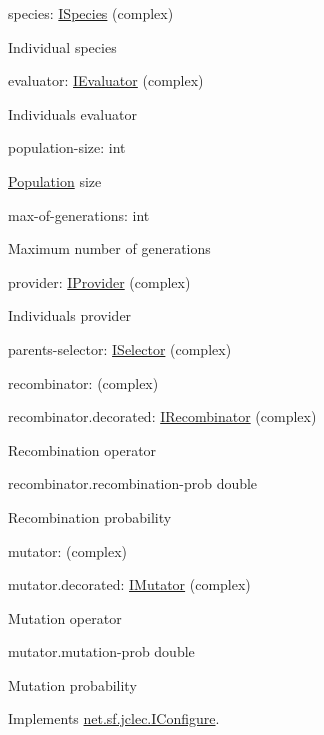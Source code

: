 \begin{DoxyItemize}
\item {\ttfamily species\-: \hyperlink{interfacenet_1_1sf_1_1jclec_1_1_i_species}{I\-Species} (complex)}

Individual species 
\item {\ttfamily evaluator\-: \hyperlink{interfacenet_1_1sf_1_1jclec_1_1_i_evaluator}{I\-Evaluator} (complex)}

Individuals evaluator 
\item {\ttfamily population-\/size\-: int}

\hyperlink{classnet_1_1sf_1_1jclec_1_1_population}{Population} size 
\item {\ttfamily max-\/of-\/generations\-: int}

Maximum number of generations  
\item {\ttfamily provider\-: \hyperlink{interfacenet_1_1sf_1_1jclec_1_1_i_provider}{I\-Provider} (complex)}

Individuals provider  
\item {\ttfamily parents-\/selector\-: \hyperlink{interfacenet_1_1sf_1_1jclec_1_1_i_selector}{I\-Selector} (complex)}  
\item {\ttfamily recombinator\-: (complex)} 
\begin{DoxyItemize}
\item {\ttfamily recombinator.\-decorated\-: \hyperlink{interfacenet_1_1sf_1_1jclec_1_1_i_recombinator}{I\-Recombinator} (complex)}

Recombination operator 
\item {\ttfamily recombinator.\-recombination-\/prob double}

Recombination probability  
\end{DoxyItemize}
\item {\ttfamily mutator\-: (complex)} 
\begin{DoxyItemize}
\item {\ttfamily mutator.\-decorated\-: \hyperlink{interfacenet_1_1sf_1_1jclec_1_1_i_mutator}{I\-Mutator} (complex) }

Mutation operator 
\item {\ttfamily mutator.\-mutation-\/prob double}

Mutation probability  
\end{DoxyItemize}
\end{DoxyItemize}

Implements \hyperlink{interfacenet_1_1sf_1_1jclec_1_1_i_configure_add31a65a04d148c690a956fbbad6987c}{net.\-sf.\-jclec.\-I\-Configure}.

